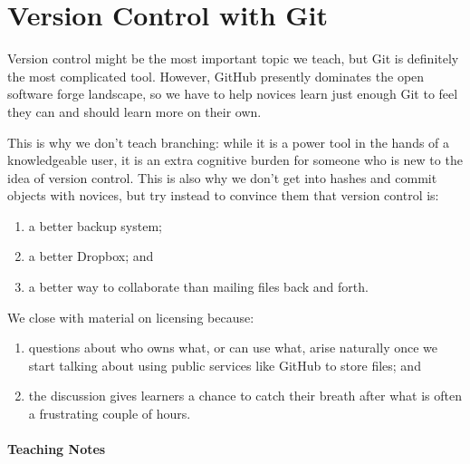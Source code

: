 \documentclass[]{book}
\begin{document}
\section{Version Control with Git}

Version control might be the most important topic we teach, but Git is
definitely the most complicated tool. However, GitHub presently
dominates the open software forge landscape, so we have to help novices
learn just enough Git to feel they can and should learn more on their
own.

This is why we don't teach branching: while it is a power tool in the
hands of a knowledgeable user, it is an extra cognitive burden for
someone who is new to the idea of version control. This is also why we
don't get into hashes and commit objects with novices, but try instead
to convince them that version control is:

\begin{enumerate}
\item
  a better backup system;
\item
  a better Dropbox; and
\item
  a better way to collaborate than mailing files back and forth.
\end{enumerate}

We close with material on licensing because:

\begin{enumerate}
\item
  questions about who owns what, or can use what, arise naturally once
  we start talking about using public services like GitHub to store
  files; and
\item
  the discussion gives learners a chance to catch their breath after
  what is often a frustrating couple of hours.
\end{enumerate}

\mbox{}\paragraph{Teaching Notes}
\end{document}
